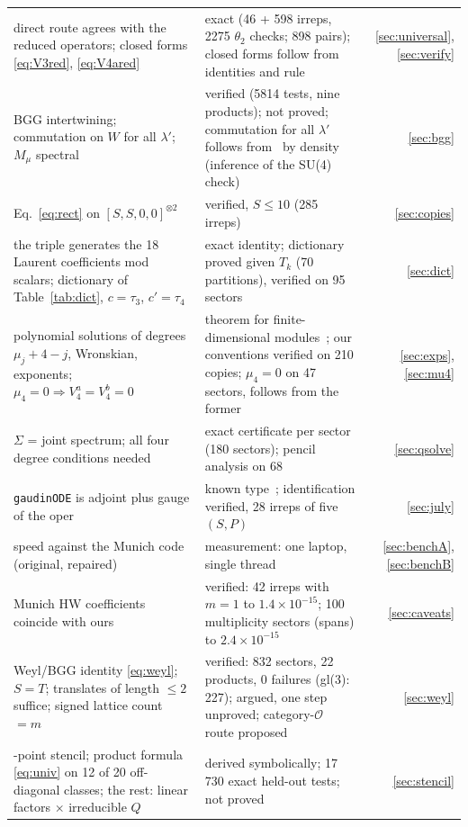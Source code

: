\documentclass[11pt]{article}
\begin{document}
\begin{table}[htbp]
\begin{tabular}{@{}>{\raggedright\arraybackslash}p{}>{\raggedright\arraybackslash}p{}r@{}}
direct route agrees with the reduced operators; closed forms \eqref{eq:V3red}, \eqref{eq:V4ared} & exact (46 + 598 irreps, 2275 $\theta_2$ checks; 898 pairs); closed forms follow from identities and rule & \ref{sec:universal}, \ref{sec:verify} \\
BGG intertwining; commutation on $W$ for all $\lambda'$; $M_\mu$ spectral & verified (5814 tests, nine products); not proved; commutation for all $\lambda'$ follows from~\cite{talalaev} by density (inference of the SU(4) check) & \ref{sec:bgg} \\
Eq.~\eqref{eq:rect} on $[S,S,0,0]^{\otimes2}$ & verified, $S\le10$ (285 irreps) & \ref{sec:copies} \\
the triple generates the 18 Laurent coefficients mod scalars; dictionary of Table~\ref{tab:dict}, $c=\tau_3$, $c'=\tau_4$ & exact identity; dictionary proved given $T_k$ (70 partitions), verified on 95 sectors & \ref{sec:dict} \\
polynomial solutions of degrees $\mu_j+4-j$, Wronskian, exponents; $\mu_4=0\Rightarrow V_4^a=V_4^b=0$ & theorem for finite-dimensional modules~\cite{mtvglasgow,rybnikov}; our conventions verified on 210 copies; $\mu_4=0$ on 47 sectors, follows from the former & \ref{sec:exps}, \ref{sec:mu4} \\
$\Sigma$ = joint spectrum; all four degree conditions needed & exact certificate per sector (180 sectors); pencil analysis on 68 & \ref{sec:qsolve} \\
\texttt{gaudinODE} is adjoint plus gauge of the oper & known type~\cite{mvdual}; identification verified, 28 irreps of five $(S,P)$ & \ref{sec:july} \\
speed against the Munich code (original, repaired) & measurement: one laptop, single thread & \ref{sec:benchA}, \ref{sec:benchB} \\
Munich HW coefficients coincide with ours & verified: 42 irreps with $m=1$ to $1.4\times10^{-15}$; 100 multiplicity sectors (spans) to $2.4\times10^{-15}$ & \ref{sec:caveats} \\
Weyl/BGG identity \eqref{eq:weyl}; $S=T$; translates of length $\le2$ suffice; signed lattice count $=m$ & verified: 832 sectors, 22 products, 0 failures (gl(3): 227); argued, one step unproved; category-$\mathcal O$ route proposed & \ref{sec:weyl} \\
21-point stencil; product formula \eqref{eq:univ} on 12 of 20 off-diagonal classes; the rest: linear factors $\times$ irreducible $Q$ & derived symbolically; 17\,730 exact held-out tests; not proved & \ref{sec:stencil} \\

\end{tabular}
\end{table}
\end{document}
